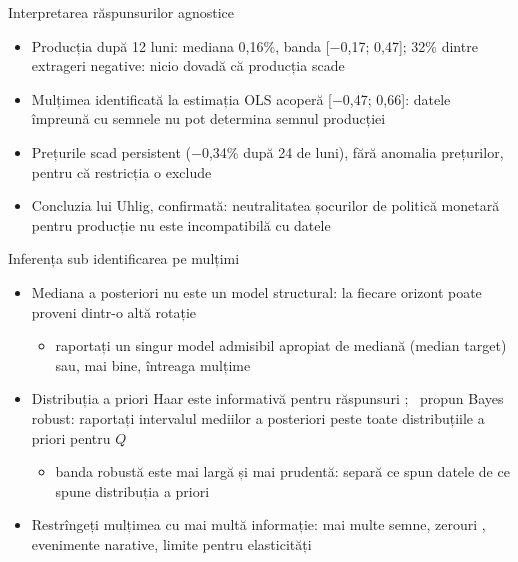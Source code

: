\begin{frame}{Interpretarea răspunsurilor agnostice}
\itemsize{\small}
\begin{itemize}
    \item Producția după 12 luni: mediana 0{,}16\%, banda [\ensuremath{-}0{,}17; 0{,}47]; 32\% dintre extrageri negative: nicio dovadă că producția scade
    \item Mulțimea identificată la estimația OLS acoperă [\ensuremath{-}0{,}47; 0{,}66]: datele împreună cu semnele nu pot determina semnul producției
    \item Prețurile scad persistent (\ensuremath{-}0{,}34\% după 24 de luni), fără anomalia prețurilor, pentru că restricția o exclude
    \item Concluzia lui Uhlig, confirmată: neutralitatea șocurilor de politică monetară pentru producție nu este incompatibilă cu datele
\end{itemize}
\end{frame}

\begin{frame}{Inferența sub identificarea pe mulțimi}
\itemsize{\small}
\begin{itemize}
    \item Mediana a posteriori nu este un model structural: la fiecare orizont poate proveni dintr-o altă rotație 
    \begin{itemize}
        \item raportați un singur model admisibil apropiat de mediană (median target) sau, mai bine, întreaga mulțime
    \end{itemize}
    \item Distribuția a priori Haar este informativă pentru răspunsuri ; \ propun Bayes robust: raportați intervalul mediilor a posteriori peste toate distribuțiile a priori pentru $Q$
    \begin{itemize}
        \item banda robustă este mai largă și mai prudentă: separă ce spun datele de ce spune distribuția a priori
    \end{itemize}
    \item Restrîngeți mulțimea cu mai multă informație: mai multe semne, zerouri , evenimente narative, limite pentru elasticități 
\end{itemize}
\end{frame}

